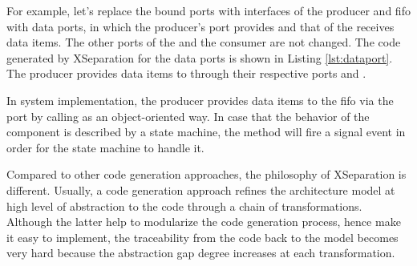 For example, let's replace the bound ports with interfaces of the producer and fifo with data ports, in which the producer's port provides and that of the  receives data items.
The other ports of the  and the consumer are not changed.
The code generated by XSeparation for the data ports is shown in Listing \ref{lst:dataport}.
The  producer provides data items to  through their respective ports  and .

\begin{minipage}{0.95\columnwidth}
	
\end{minipage} 

In system implementation, the producer provides data items to the fifo via the port  by calling  as an object-oriented way.
In case that the behavior of the component is described by a state machine, the  method will fire a signal event in order for the state machine to handle it.


\vskip 0.1cm
Compared to other code generation approaches, the philosophy of XSeparation is different.
Usually, a code generation approach refines the architecture model at high level of abstraction to the code through a chain of transformations.
Although the latter help to modularize the code generation process, hence make it easy to implement, the traceability from the code back to the model becomes very hard because the abstraction gap degree increases at each transformation.

